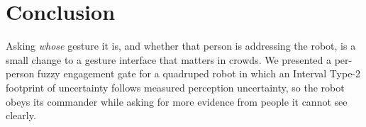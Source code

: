 \section{Conclusion}
\label{sec:conclusion}

Asking \emph{whose} gesture it is, and whether that person is addressing the
robot, is a small change to a gesture interface that matters in crowds. We
presented a per-person fuzzy engagement gate for a quadruped robot in which
an Interval Type-2 footprint of uncertainty follows measured perception
uncertainty, so the robot obeys its commander while asking for more evidence
from people it cannot see clearly. 
